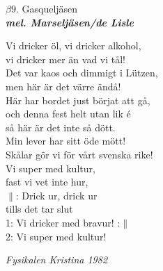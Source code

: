 \documentclass[a6paper,10pt]{article}
\newcommand{\mel}[1]{\small\textbf{\textit{mel. #1 \\}}}
\begin{document}
\begin{center}
\Large $\beta9$. Gasqueljäsen \\ 
\mel{Marseljäsen/de Lisle}
\end{center}
Vi dricker öl, vi dricker alkohol,\\
vi dricker mer än vad vi tål!\\
Det var kaos och dimmigt i Lützen,\\
men här är det värre ändå!\\
Här har bordet just börjat att gå,\\
och denna fest helt utan lik é\\
så här är det inte så dött.\\
Min lever har sitt öde mött!\\
Skålar gör vi för vårt svenska rike!\\
Vi super med kultur,\\
fast vi vet inte hur,\\
\newline
$\|$: Drick ur, drick ur\\
tills det tar slut\\
1: Vi dricker med bravur! :$\|$\\
2: Vi super med kultur!
\begin{flushright}
\textit{Fysikalen Kristina 1982}
\end{flushright}
\end{document}
